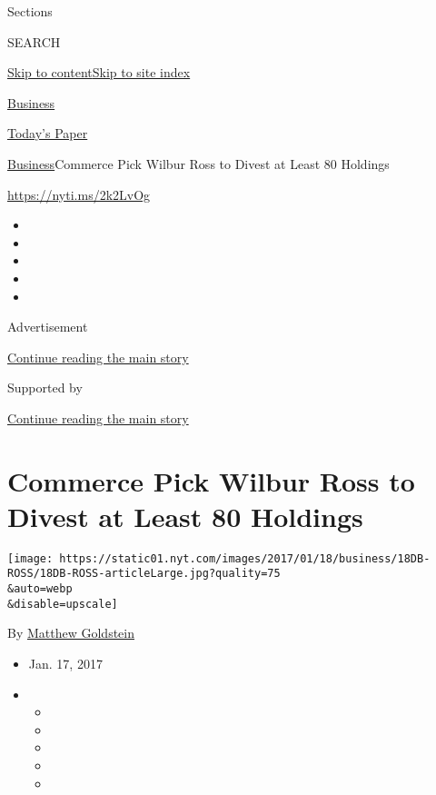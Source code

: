 Sections

SEARCH

\protect\hyperlink{site-content}{Skip to
content}\protect\hyperlink{site-index}{Skip to site index}

\href{https://www.nytimes.com/section/business}{Business}

\href{https://myaccount.nytimes.com/auth/login?response_type=cookie\&client_id=vi}{}

\href{https://www.nytimes.com/section/todayspaper}{Today's Paper}

\href{/section/business}{Business}\textbar{}Commerce Pick Wilbur Ross to
Divest at Least 80 Holdings

\url{https://nyti.ms/2k2LvOg}

\begin{itemize}
\item
\item
\item
\item
\item
\end{itemize}

Advertisement

\protect\hyperlink{after-top}{Continue reading the main story}

Supported by

\protect\hyperlink{after-sponsor}{Continue reading the main story}

\hypertarget{commerce-pick-wilbur-ross-to-divest-at-least-80-holdings}{%
\section{Commerce Pick Wilbur Ross to Divest at Least 80
Holdings}\label{commerce-pick-wilbur-ross-to-divest-at-least-80-holdings}}

\texttt{[image: https://static01.nyt.com/images/2017/01/18/business/18DB-ROSS/18DB-ROSS-articleLarge.jpg?quality=75\\\&auto=webp\\\&disable=upscale]}

By \href{http://www.nytimes.com/by/matthew-goldstein}{Matthew Goldstein}

\begin{itemize}
\item
  Jan. 17, 2017
\item
  \begin{itemize}
  \item
  \item
  \item
  \item
  \item
  \end{itemize}
\end{itemize}

